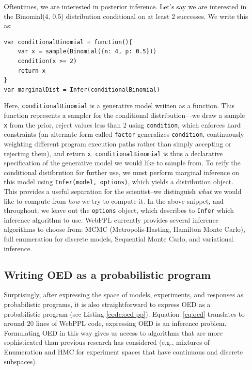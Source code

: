\documentclass{article}
\begin{document}
Oftentimes, we are interested in posterior inference. Let's say we are interested in the Binomial(4, 0.5) distribution conditional on at least 2 successes. We write this as:
%
\begin{lstlisting}[mathescape, label={code:webppl}]
var conditionalBinomial = function(){
	var x = sample(Binomial({n: 4, p: 0.5}))
	condition(x >= 2)
	return x
}
var marginalDist = Infer(conditionalBinomial)
\end{lstlisting}
Here, \lstinline{conditionalBinomial} is a generative model written as a function.
This function represents a sampler for the conditional distribution---we draw a sample \lstinline{x} from the prior, reject values less than 2 using \lstinline{condition}, which enforces hard constraints (an alternate form called \lstinline{factor} generalizes \lstinline{condition}, continuously weighting different program execution paths rather than simply accepting or rejecting them), and return \lstinline{x}.
\lstinline{conditionalBinomial} is thus a declarative specification of the generative model we would like to sample from.
To reify the conditional distibrution for further use, we must perform marginal inference on this model using \lstinline{Infer(model, options)}, which yields a distribution object.
This provides a useful separation for the scientist--we distinguish \emph{what} we would like to compute from \emph{how} we try to compute it.
In the above snippet, and throughout, we leave out the \lstinline{options} object, which describes to \lstinline{Infer} which inference algorithm to use. WebPPL currently provides several inference algorithms to choose from: MCMC (Metropolis-Hasting, Hamilton Monte Carlo), full enumeration for discrete models, Sequential Monte Carlo, and variational inference.


\subsection{Writing OED as a probabilistic program}

Surprisingly, after expressing the space of models, experiments, and responses as probabilistic programs, it is also straightforward to express OED as a probabilistic program (see Listing \ref{code:oed-pp}).
Equation~\ref{eq:oed} translates to around 20 lines of WebPPL code, expressing OED is an inference problem.
Formulating OED in this way gives us access to algorithms that are more sophisticated than previous research has considered  (e.g., mixtures of Enumeration and HMC for experiment spaces that have continuous and discrete subspaces).
\end{document}

